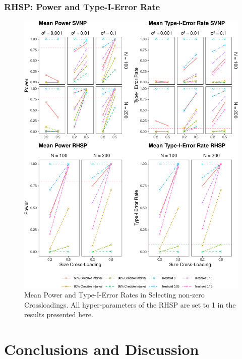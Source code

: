 \documentclass[
  man, donotrepeattitle,floatsintext]{apa6}
\begin{document}
\hypertarget{rhsp-power-and-type-i-error-rate}{%
\subsubsection{RHSP: Power and Type-I-Error Rate}\label{rhsp-power-and-type-i-error-rate}}

\begin{figure}
\centering
\includegraphics{JMBKoch_thesis_files/figure-latex/unnamed-chunk-5-1.pdf}
\caption{\label{fig:unnamed-chunk-5}Mean Power and Type-I-Error Rates in Selecting non-zero Crossloadings. All hyper-parameters of the RHSP are set to 1 in the results presented here.}
\end{figure}

\hypertarget{conclusions-and-discussion}{%
\section{Conclusions and Discussion}\label{conclusions-and-discussion}}
\end{document}
